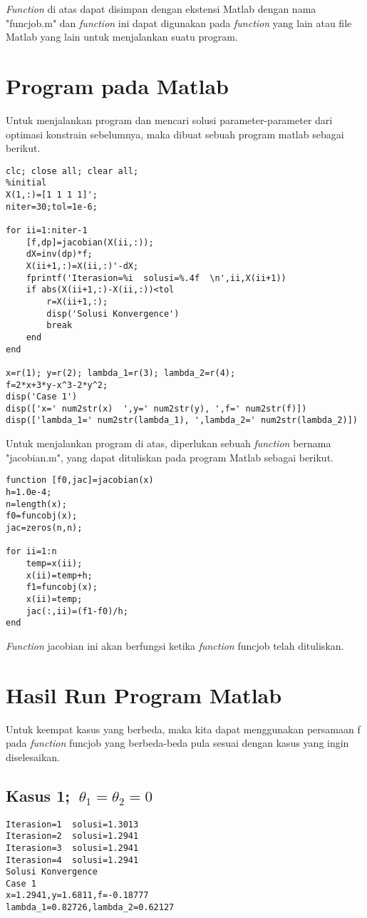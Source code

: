 \documentclass{article}
\begin{document}
\textit{Function} di atas dapat disimpan dengan ekstensi Matlab dengan nama "funcjob.m" dan \textit{function} ini dapat digunakan pada \textit{function} yang lain atau file Matlab yang lain untuk menjalankan suatu program.

\section*{Program pada Matlab}
Untuk menjalankan program dan mencari solusi parameter-parameter dari optimasi konstrain sebelumnya, maka dibuat sebuah program matlab sebagai berikut.

\begin{lstlisting}
clc; close all; clear all;
%initial
X(1,:)=[1 1 1 1]';
niter=30;tol=1e-6;

for ii=1:niter-1
    [f,dp]=jacobian(X(ii,:));
    dX=inv(dp)*f;
    X(ii+1,:)=X(ii,:)'-dX;
    fprintf('Iterasion=%i  solusi=%.4f  \n',ii,X(ii+1))
    if abs(X(ii+1,:)-X(ii,:))<tol
        r=X(ii+1,:);
        disp('Solusi Konvergence')
        break
    end
end

x=r(1); y=r(2); lambda_1=r(3); lambda_2=r(4);
f=2*x+3*y-x^3-2*y^2;
disp('Case 1')
disp(['x=' num2str(x)  ',y=' num2str(y), ',f=' num2str(f)])
disp(['lambda_1=' num2str(lambda_1), ',lambda_2=' num2str(lambda_2)])
\end{lstlisting}
\bigskip
Untuk menjalankan program di atas, diperlukan sebuah \textit{function} bernama "jacobian.m", yang dapat dituliskan pada program Matlab sebagai berikut.
\begin{lstlisting}
function [f0,jac]=jacobian(x)
h=1.0e-4;
n=length(x);
f0=funcobj(x);
jac=zeros(n,n);

for ii=1:n
    temp=x(ii);
    x(ii)=temp+h;
    f1=funcobj(x);
    x(ii)=temp;
    jac(:,ii)=(f1-f0)/h;
end
\end{lstlisting}
\textit{Function} jacobian ini akan berfungsi ketika \textit{function} funcjob telah dituliskan.

\section*{Hasil Run Program Matlab}
Untuk keempat kasus yang berbeda, maka kita dapat menggunakan persamaan f pada \textit{function} funcjob yang berbeda-beda pula sesuai dengan kasus yang ingin diselesaikan.

\subsection*{Kasus 1; \(\ \theta_1=\theta_2=0\)}
\begin{lstlisting}
Iterasion=1  solusi=1.3013  
Iterasion=2  solusi=1.2941  
Iterasion=3  solusi=1.2941  
Iterasion=4  solusi=1.2941  
Solusi Konvergence
Case 1
x=1.2941,y=1.6811,f=-0.18777
lambda_1=0.82726,lambda_2=0.62127
\end{lstlisting}
\end{document}
